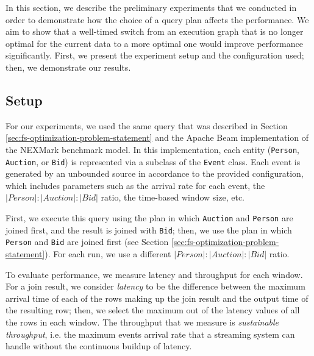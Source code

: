 \label {sec:fs-optimization-experiments}
In this section, we describe the preliminary experiments that we conducted in order to demonstrate how the choice of a query plan affects the performance. We aim to show that a well-timed switch from an execution graph that is no longer optimal for the current data to a more optimal one would improve performance significantly. First, we present the experiment setup and the configuration used; then, we demonstrate our results. 
\subsection{Setup}

For our experiments, we used the same query that was described in Section \ref{sec:fs-optimization-problem-statement} and the Apache Beam implementation of the NEXMark benchmark model. In this implementation, each entity (\texttt{Person}, \texttt{Auction}, or \texttt{Bid}) is represented via a subclass of the \texttt{Event} class. Each event is generated by an unbounded source in accordance to the provided configuration, which includes parameters such as the arrival rate for each event, the $|Person|:|Auction|:|Bid|$ ratio, the time-based window size, etc. 

First, we execute this query using the plan in which \texttt{Auction} and \texttt{Person} are joined first, and the result is joined with \texttt{Bid}; then, we use the plan in which \texttt{Person} and \texttt{Bid} are joined first (see Section  \ref{sec:fs-optimization-problem-statement}). For each run, we use a different $|Person|:|Auction|:|Bid|$ ratio.

To evaluate performance, we measure latency and throughput for each window. For a join result, we consider \textit{latency} to be the difference between the maximum arrival time of each of the rows making up the join result and the output time of the resulting row; then, we select the maximum out of the latency values of all the rows in each window. The throughput that we measure is \textit{sustainable throughput}, i.e. the maximum events arrival rate that a streaming system can handle without the continuous buildup of latency.

